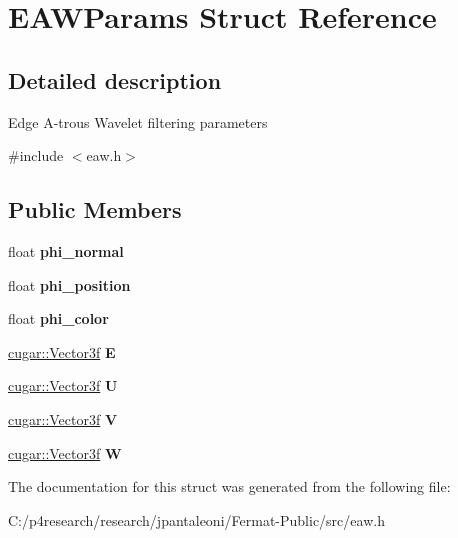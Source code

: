 \hypertarget{struct_e_a_w_params}{}\section{E\+A\+W\+Params Struct Reference}
\label{struct_e_a_w_params}


\subsection{Detailed description}
Edge A-\/trous Wavelet filtering parameters 

{\ttfamily \#include $<$eaw.\+h$>$}

\subsection*{Public Members}
\begin{DoxyCompactItemize}
\item 
\mbox{\label{struct_e_a_w_params_a9ee45dea99d29409783d1f0a88409c78}} 
float {\bfseries phi\+\_\+normal}
\item 
\mbox{\label{struct_e_a_w_params_a95097b3ff69a35303a0e89fdd5a3e29c}} 
float {\bfseries phi\+\_\+position}
\item 
\mbox{\label{struct_e_a_w_params_a397e1f5ec073710f037c0dece69f4099}} 
float {\bfseries phi\+\_\+color}
\item 
\mbox{\label{struct_e_a_w_params_afaff82e5eafdd19859beba1c88d3bf1e}} 
\hyperlink{structcugar_1_1_vector}{cugar\+::\+Vector3f} {\bfseries E}
\item 
\mbox{\label{struct_e_a_w_params_afdf22d1c4454bd9f012a7b4fcefbde6b}} 
\hyperlink{structcugar_1_1_vector}{cugar\+::\+Vector3f} {\bfseries U}
\item 
\mbox{\label{struct_e_a_w_params_acad41fd52ba4511d51a811dea37f0d64}} 
\hyperlink{structcugar_1_1_vector}{cugar\+::\+Vector3f} {\bfseries V}
\item 
\mbox{\label{struct_e_a_w_params_a8fd24cec2ba7537155c9b70e1782689c}} 
\hyperlink{structcugar_1_1_vector}{cugar\+::\+Vector3f} {\bfseries W}
\end{DoxyCompactItemize}


The documentation for this struct was generated from the following file\+:\begin{DoxyCompactItemize}
\item 
C\+:/p4research/research/jpantaleoni/\+Fermat-\/\+Public/src/eaw.\+h\end{DoxyCompactItemize}
